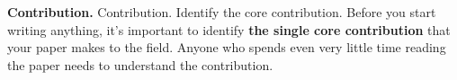 \textbf{Contribution.}
 Contribution. Identify the core contribution. Before you start writing anything, it’s important to identify \textbf{the single core contribution} that your paper makes to the field. Anyone who spends even very little time reading the paper needs to understand the contribution.

